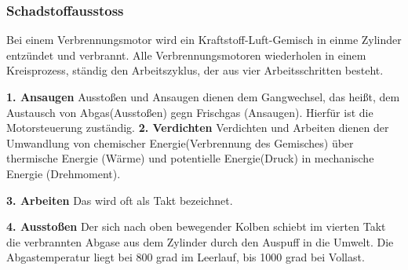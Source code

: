 \subsubsection{Schadstoffausstoss}
\label{subsec:schadstoffausstoss}

Bei einem Verbrennungsmotor wird ein Kraftstoff-Luft-Gemisch in einme Zylinder entzündet und verbrannt.
Alle Verbrennungsmotoren wiederholen in einem Kreisprozess, ständig den Arbeitszyklus, der aus vier Arbeitsschritten besteht.

\textbf{1. Ansaugen}
Ausstoßen und Ansaugen dienen dem Gangwechsel, das heißt, dem Austausch von Abgas(Ausstoßen) gegn Frischgas (Ansaugen). Hierfür ist die Motorsteuerung zuständig.
\newline
\textbf{2. Verdichten}
Verdichten und Arbeiten dienen der Umwandlung von chemischer Energie(Verbrennung des Gemisches) über thermische Energie (Wärme) und potentielle Energie(Druck) in mechanische Energie (Drehmoment).

\newline
\textbf{3. Arbeiten}
Das wird oft als Takt bezeichnet.

\newline
\textbf{4. Ausstoßen }
Der sich nach oben bewegender Kolben schiebt im vierten Takt die verbrannten Abgase aus dem Zylinder durch den Auspuff in die Umwelt. 
Die Abgastemperatur liegt bei 800 grad im Leerlauf, bis 1000 grad bei Vollast. 
\newline 



\clearpage %